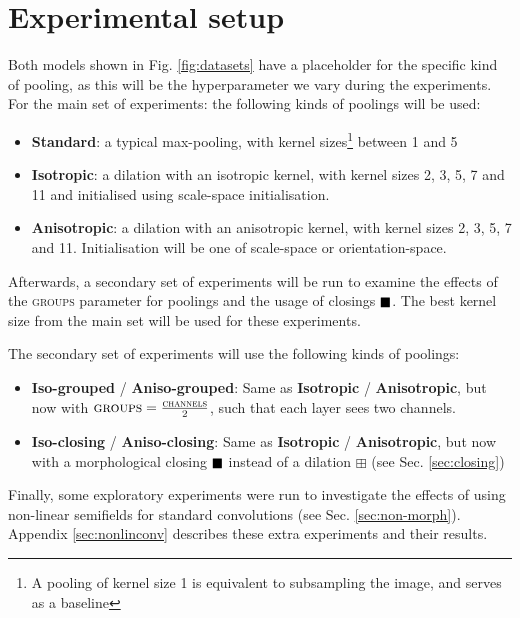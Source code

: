 \documentclass[a4paper, 12pt]{report}
\DeclareMathOperator{\boxclose}{\vcenter{\hbox{$\blacksquare$}}}
\begin{document}
\newpage
\section{Experimental setup}
\label{sec:setup}
Both models shown in Fig. \ref{fig:datasets} have a placeholder for the specific kind of pooling, as this will be the hyperparameter we vary during the experiments.
For the main set of experiments: the following kinds of poolings will be used:
\begin{itemize}
\vspace{-0.1cm}
\setlength{\itemsep}{0pt}
	\item \textbf{Standard}: a typical max-pooling, with kernel sizes\footnote{A pooling of kernel size 1 is equivalent to subsampling the image, and serves as a baseline} between 1 and 5
	\item \textbf{Isotropic}: a dilation with an isotropic kernel, with kernel sizes 2, 3, 5, 7 and 11 and initialised using scale-space initialisation.
	\item \textbf{Anisotropic}: a dilation with an anisotropic kernel, with kernel sizes 2, 3, 5, 7 and 11. Initialisation will be one of scale-space or orientation-space.
\end{itemize}
\vspace{-0.1cm}
Afterwards, a secondary set of experiments will be run to examine the effects of the \textsc{groups} parameter for poolings and the usage of closings $\boxclose$. The best kernel size from the main set will be used for these experiments.

The secondary set of experiments will use the following kinds of poolings:
\begin{itemize}
\vspace{-0.1cm}
\setlength{\itemsep}{0pt}
	\item \textbf{Iso-grouped} / \textbf{Aniso-grouped}: Same as \textbf{Isotropic} / \textbf{Anisotropic}, but now with $\textsc{groups}=\frac{\textsc{channels}}{2}$, such that each layer sees two channels.
	\item \textbf{Iso-closing} / \textbf{Aniso-closing}: Same as \textbf{Isotropic} / \textbf{Anisotropic}, but now with a morphological closing $\boxclose$ instead of a dilation $\boxplus$ (see Sec. \ref{sec:closing})
\end{itemize}
\vspace{-0.1cm}
Finally, some exploratory experiments were run to investigate the effects of using non-linear semifields for standard convolutions (see Sec. \ref{sec:non-morph}). Appendix \ref{sec:nonlinconv} describes these extra experiments and their results.
\end{document}
